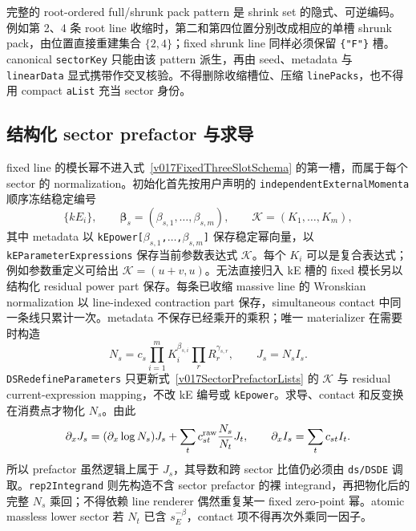 ﻿\documentclass[a4paper,11pt]{article}
\begin{document}
完整的 root-ordered full/shrunk pack pattern 是 shrink set 的隐式、可逆编码。例如第 2、4 条 root line 收缩时，第二和第四位置分别改成相应的单槽 shrunk pack，由位置直接重建集合 $\{2,4\}$；fixed shrunk line 同样必须保留 \texttt{\{"F"\}} 槽。canonical \texttt{sectorKey} 只能由该 pattern 派生，再由 seed、metadata 与 \texttt{linearData} 显式携带作交叉核验。不得删除收缩槽位、压缩 \texttt{linePacks}，也不得用 compact \texttt{aList} 充当 sector 身份。

\subsection{结构化 sector prefactor 与求导}

fixed line 的模长幂不进入式~\eqref{v017FixedThreeSlotSchema} 的第一槽，而属于每个 sector 的 normalization。初始化首先按用户声明的 \texttt{independentExternalMomenta} 顺序冻结稳定编号
\begin{equation}
 \{kE_i\},\qquad \boldsymbol\beta_s=(\beta_{s,1},\ldots,\beta_{s,m}),
 \qquad \mathcal K=(K_1,\ldots,K_m),
 \label{v017SectorPrefactorLists}
\end{equation}
其中 metadata 以 \texttt{kEpower[$\beta_{s,1}$,$\ldots$,$\beta_{s,m}$]} 保存稳定幂向量，以 \texttt{kEParameterExpressions} 保存当前参数表达式 $\mathcal K$。每个 $K_i$ 可以是复合表达式；例如参数重定义可给出 $\mathcal K=(u+v,u)$。无法直接归入 kE 槽的 fixed 模长另以结构化 residual power part 保存。每条已收缩 massive line 的 Wronskian normalization 以 line-indexed contraction part 保存，simultaneous contact 中同一条线只累计一次。metadata 不保存已经乘开的乘积；唯一 materializer 在需要时构造
\begin{equation}
 N_s=c_s\prod_{i=1}^{m}K_i^{\beta_{s,i}}\prod_r R_r^{\gamma_{s,r}},
 \qquad J_s=N_s I_s.
 \label{v017SectorNormalization}
\end{equation}
\texttt{DSRedefineParameters} 只更新式~\eqref{v017SectorPrefactorLists} 的 $\mathcal K$ 与 residual current-expression mapping，不改 kE 编号或 \texttt{kEpower}。求导、contact 和反变换在消费点才物化 $N_s$。由此
\begin{equation}
 \partial_xJ_s=(\partial_x\log N_s)J_s
 +\sum_t c^{\rm raw}_{st}{N_s\over N_t}J_t,
 \qquad
 \partial_xI_s=\sum_t c_{st}I_t.
 \label{v017NormalizedDerivative}
\end{equation}
所以 prefactor 虽然逻辑上属于 $J_s$，其导数和跨 sector 比值仍必须由 \texttt{ds/DSDE} 调取。\texttt{rep2Integrand} 则先构造不含 sector prefactor 的裸 integrand，再把物化后的完整 $N_s$ 乘回；不得依赖 line renderer 偶然重复某一 fixed zero-point 幂。atomic massless lower sector 若 $N_t$ 已含 $s_E^{-\beta}$，contact 项不得再次外乘同一因子。
\end{document}
